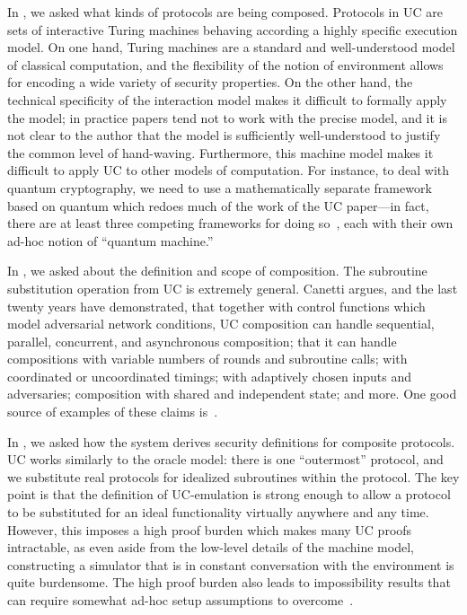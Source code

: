 In , we asked what kinds of protocols are
being composed. Protocols in UC are sets of interactive Turing machines behaving
according a highly specific execution model. On one hand, Turing machines are a
standard and well-understood model of classical computation, and the flexibility
of the notion of environment allows for encoding a wide variety of security
properties. On the other hand, the technical specificity of the interaction
model makes it difficult to formally apply the model; in practice papers tend
not to work with the precise model, and it is not clear to the author that the
model is sufficiently well-understood to justify the common level of
hand-waving. Furthermore, this machine model makes it difficult to apply UC to
other models of computation. For instance, to deal with quantum cryptography, we
need to use a mathematically separate framework based on quantum which redoes
much of the work of the UC paper---in fact, there are at least three competing
frameworks for doing so~\cite{unruh-2004,benor-2004,unruh-2010}, each with their
own ad-hoc notion of ``quantum machine.''

In , we
asked about the definition and scope of composition. The subroutine substitution
operation from UC is extremely general. Canetti argues, and the last twenty
years have demonstrated, that together with control functions which model
adversarial network conditions, UC composition can handle sequential, parallel,
concurrent, and asynchronous composition; that it can handle compositions with
variable numbers of rounds and subroutine calls; with coordinated or
uncoordinated timings; with adaptively chosen inputs and adversaries;
composition with shared and independent state; and more. One good source of
examples of these claims is~\cite{canetti-2006}.

In , we asked how the system derives
security definitions for composite protocols. UC works similarly to the oracle
model: there is one ``outermost'' protocol, and we substitute real protocols for
idealized subroutines within the protocol. The key point is that the definition
of UC-emulation is strong enough to allow a protocol to be substituted for an
ideal functionality virtually anywhere and any time. However, this imposes a
high proof burden which makes many UC proofs intractable, as even aside from the
low-level details of the machine model, constructing a simulator that is in
constant conversation with the environment is quite burdensome. The high proof
burden also leads to impossibility results that can require somewhat ad-hoc
setup assumptions to
overcome~\cite{canetti-fischlin-2001,barak-et-al-2004,kidron-lindell-2007,jost-2020}.

